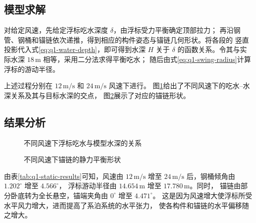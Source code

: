 \subsection{模型求解}

对给定风速，先给定浮标吃水深度 \(\delta\)，由浮标受力平衡确定顶部拉力；
再沿钢管、钢桶和锚链依次递推，得到相应的构件姿态与锚链几何形状。将各段的
竖直投影代入式\eqref{eq:q1-water-depth}，即可得到水深 \(H\) 关于 \(\delta\)
的函数关系。令其与实际水深 \(18\,\mathrm m\) 相等，采用二分法求得平衡吃水；
随后由式\eqref{eq:q1-swing-radius}计算浮标的游动半径。

上述过程分别在 \(12\,\mathrm{m/s}\) 和 \(24\,\mathrm{m/s}\) 风速下进行。
图\ref{fig:q1-depth-draft}给出了不同风速下的吃水--水深关系及其与目标水深的交点，
图\ref{fig:q1-chain-shapes}展示了对应的锚链形状。

\subsection{结果分析}

\begin{figure}[H]
  \centering
  
  \caption{不同风速下浮标吃水与模型水深的关系}
  \label{fig:q1-depth-draft}
\end{figure}

\begin{figure}[H]
  \centering
  
  \caption{不同风速下锚链的静力平衡形状}
  \label{fig:q1-chain-shapes}
\end{figure}

\begin{table}[H]
  \centering
  \caption{问题一两种风速下的求解结果}
  \label{tab:q1-static-results}
  \small
  
\end{table}

由表\ref{tab:q1-static-results}可知，风速由 \(12\,\mathrm{m/s}\) 增至
\(24\,\mathrm{m/s}\) 后，钢桶倾角由 \(1.202^\circ\) 增至 \(4.566^\circ\)，
浮标游动半径由 \(14.654\,\mathrm m\) 增至 \(17.780\,\mathrm m\)。同时，
锚链由部分卧底转为全长悬空，锚端夹角由 \(0^\circ\) 增至 \(4.471^\circ\)。
这是因为风速增大使浮标所受水平风力增大，进而提高了系泊系统的水平张力，
使各构件和锚链的水平偏移随之增大。
